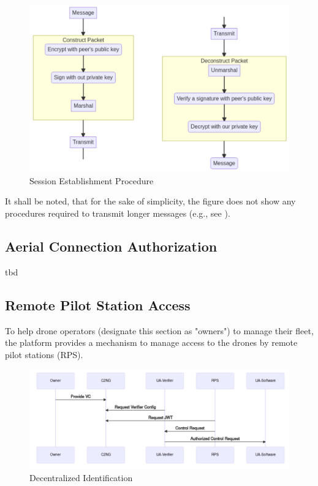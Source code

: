 \documentclass[a4paper,conference]{IEEEtran}
\begin{document}
\begin{figure}[!ht]
\centering
\includegraphics[width=0.9\linewidth]{images/exchange.png}
\caption{Session Establishment Procedure}\label{fig:exchange}
\end{figure}

It shall be noted, that for the sake of simplicity, the figure does not show any procedures required to transmit longer messages (e.g., see \cite{cryptoeprint:2000/065}). 

\subsection{Aerial Connection Authorization}

tbd


\subsection{Remote Pilot Station Access}
\label{section:did}

To help drone operators (designate this section as "owners") to manage their fleet, the platform provides a mechanism to manage access to the drones by remote pilot stations (RPS).

\begin{figure}[!ht]
\centering
\includegraphics[width=0.9\linewidth]{images/did.png}
\caption{Decentralized Identification}\label{fig:did}
\end{figure}
\end{document}

